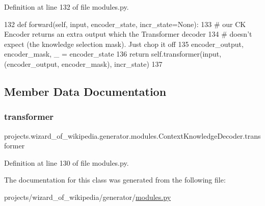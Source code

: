 Definition at line 132 of file modules.\+py.


\begin{DoxyCode}
132     \textcolor{keyword}{def }forward(self, input, encoder\_state, incr\_state=None):
133         \textcolor{comment}{# our CK Encoder returns an extra output which the Transformer decoder}
134         \textcolor{comment}{# doesn't expect (the knowledge selection mask). Just chop it off}
135         encoder\_output, encoder\_mask, \_ = encoder\_state
136         \textcolor{keywordflow}{return} self.transformer(input, (encoder\_output, encoder\_mask), incr\_state)
137 \end{DoxyCode}


\subsection{Member Data Documentation}
\mbox{\label{classprojects_1_1wizard__of__wikipedia_1_1generator_1_1modules_1_1ContextKnowledgeDecoder_a83385b523ae134dcf14e6bc0a9a82b8c}} 
\subsubsection{\texorpdfstring{transformer}{transformer}}
{\footnotesize\ttfamily projects.\+wizard\+\_\+of\+\_\+wikipedia.\+generator.\+modules.\+Context\+Knowledge\+Decoder.\+transformer}



Definition at line 130 of file modules.\+py.



The documentation for this class was generated from the following file\+:\begin{DoxyCompactItemize}
\item 
projects/wizard\+\_\+of\+\_\+wikipedia/generator/\hyperlink{projects_2wizard__of__wikipedia_2generator_2modules_8py}{modules.\+py}\end{DoxyCompactItemize}
